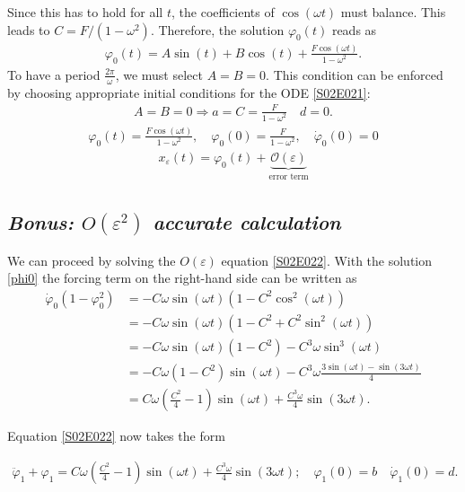 \begin{solution}[2.4]
\begin{enumerate}
Since this has to hold for all $t$, the coefficients of $\cos (\omega t)$ must balance. This leads to $C = F/(1-\omega^2)$. Therefore, the solution $\varphi_0(t)$ reads as 
\begin{align}
	\varphi_0(t) = A\sin(t) + B\cos(t) + \frac{F\cos(\omega t)}{1-\omega^2} \label{S02E023_2}.
\end{align}
To have a period  $\frac{2\pi}{\omega}$, we must select $A=B=0$. 
This condition can be enforced by choosing appropriate initial conditions for the ODE \eqref{S02E021}:
\begin{align}\label{S02E024}
	A=B=0 \Longrightarrow a = C = \frac{F}{1-\omega^2} \quad d =0. 
\end{align}
\begin{align}
\label{phi0}
\boxed{\varphi_0(t) = \frac{F\cos(\omega t)}{1-\omega^2}, \quad \varphi_0(0) = \frac{F}{1-\omega^2}, \quad \dot{\varphi}_0(0)=0}
\end{align}
\begin{align}
	x_\varepsilon(t) = \varphi_0(t) + \underbrace{\mathcal{O}(\varepsilon)}_\text{error term}
\end{align}

\subsection*{{\em Bonus: $O(\varepsilon^2)$ accurate calculation}}
We can proceed by solving the $O(\varepsilon)$ equation \eqref{S02E022}. With the solution \eqref{phi0} the forcing term on the right-hand side can be written as
\begin{align}
 \dot{\varphi}_0(1-\varphi_0^2) &= -C\omega \sin (\omega t)\left(1 - C^2 \cos^2 (\omega t)\right) \\
 & = -C\omega \sin(\omega t)\left(1 - C^2 + C^2\sin^2 (\omega t)\right)  \\
 & = -C\omega \sin(\omega t)(1 - C^2) - C^3\omega \sin^3 (\omega t) \\
 & = -C\omega(1-C^2) \sin(\omega t) - C^3 \omega \frac{3 \sin (\omega t) - \sin (3\omega t)}{4} \\
 & = C\omega\left(\frac{C^2}{4}-1\right)\sin (\omega t) + \frac{C^3 \omega }{4}\sin (3\omega t).
\end{align}

Equation \eqref{S02E022} now takes the form 

\begin{align}
\ddot{\varphi}_1 + \varphi_1 = C\omega\left(\frac{C^2}{4}-1\right)\sin (\omega t) + \frac{C^3 \omega }{4}\sin (3\omega t) ; \quad \varphi_1(0)=b \quad \dot{\varphi}_1(0)=d.
\end{align}


\end{enumerate}
\end{solution}
